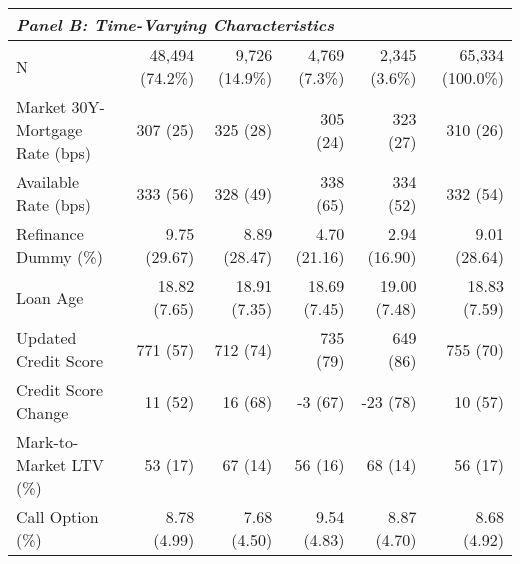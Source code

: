 \documentclass[11pt]{article}
\begin{document}
{\begin{table}[!h]
{\begin{tabular}{lccccc}
\midrule
\multicolumn{6}{l}{\textit{Panel B: Time-Varying Characteristics}} \\
\midrule

\multicolumn{1}{l}{N} &
  \multicolumn{1}{r}{48,494 (74.2\%)} &
  \multicolumn{1}{r}{9,726 (14.9\%)} &
  \multicolumn{1}{r}{4,769 (7.3\%)} &
  \multicolumn{1}{r}{2,345 (3.6\%)} &
  \multicolumn{1}{r}{65,334 (100.0\%)} \\
\multicolumn{1}{l}{Market 30Y-Mortgage Rate (bps)} &
  \multicolumn{1}{r}{307 (25)} &
  \multicolumn{1}{r}{325 (28)} &
  \multicolumn{1}{r}{305 (24)} &
  \multicolumn{1}{r}{323 (27)} &
  \multicolumn{1}{r}{310 (26)} \\
\multicolumn{1}{l}{Available Rate (bps)} &
  \multicolumn{1}{r}{333 (56)} &
  \multicolumn{1}{r}{328 (49)} &
  \multicolumn{1}{r}{338 (65)} &
  \multicolumn{1}{r}{334 (52)} &
  \multicolumn{1}{r}{332 (54)} \\
\multicolumn{1}{l}{Refinance Dummy (\%)} &
  \multicolumn{1}{r}{9.75 (29.67)} &
  \multicolumn{1}{r}{8.89 (28.47)} &
  \multicolumn{1}{r}{4.70 (21.16)} &
  \multicolumn{1}{r}{2.94 (16.90)} &
  \multicolumn{1}{r}{9.01 (28.64)} \\
\multicolumn{1}{l}{Loan Age} &
  \multicolumn{1}{r}{18.82 (7.65)} &
  \multicolumn{1}{r}{18.91 (7.35)} &
  \multicolumn{1}{r}{18.69 (7.45)} &
  \multicolumn{1}{r}{19.00 (7.48)} &
  \multicolumn{1}{r}{18.83 (7.59)} \\
\multicolumn{1}{l}{Updated Credit Score} &
  \multicolumn{1}{r}{771 (57)} &
  \multicolumn{1}{r}{712 (74)} &
  \multicolumn{1}{r}{735 (79)} &
  \multicolumn{1}{r}{649 (86)} &
  \multicolumn{1}{r}{755 (70)} \\
\multicolumn{1}{l}{Credit Score Change} &
  \multicolumn{1}{r}{11 (52)} &
  \multicolumn{1}{r}{16 (68)} &
  \multicolumn{1}{r}{-3 (67)} &
  \multicolumn{1}{r}{-23 (78)} &
  \multicolumn{1}{r}{10 (57)} \\
\multicolumn{1}{l}{Mark-to-Market LTV (\%)} &
  \multicolumn{1}{r}{53 (17)} &
  \multicolumn{1}{r}{67 (14)} &
  \multicolumn{1}{r}{56 (16)} &
  \multicolumn{1}{r}{68 (14)} &
  \multicolumn{1}{r}{56 (17)} \\
\multicolumn{1}{l}{Call Option (\%)} &
  \multicolumn{1}{r}{8.78 (4.99)} &
  \multicolumn{1}{r}{7.68 (4.50)} &
  \multicolumn{1}{r}{9.54 (4.83)} &
  \multicolumn{1}{r}{8.87 (4.70)} &
  \multicolumn{1}{r}{8.68 (4.92)} \\

\bottomrule
\end{tabular}
}
\end{table}
\FloatBarrier
\clearpage

}
\end{document}
